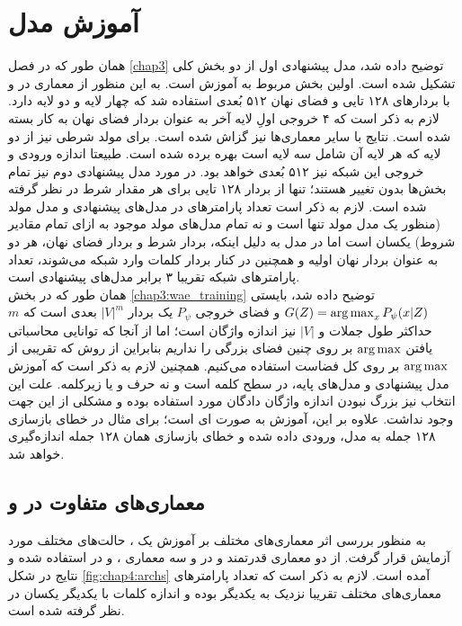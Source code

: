 \section{آموزش مدل}
همان طور که در فصل \ref{chap3} توضیح داده شد، مدل پیشنهادی اول از دو بخش کلی تشکیل شده است. اولین بخش مربوط به آموزش \wae{} است. به این منظور از معماری \transformer{} در \encoder{} و \decoder{} با بردارهای  \embedding{}
۱۲۸ تایی و فضای نهان ۵۱۲ بُعدی استفاده شد که \encoder{} چهار لایه و \decoder{} دو لایه دارد. لازم به ذکر است که ۴ خروجی اولِ لایه آخر \encoder{} به عنوان بردار فضای نهان به کار بسته شده است. نتایج با سایر معماری‌ها نیز گزاش شده‌ است. برای مولد شرطی نیز از دو لایه  که هر لایه آن شامل سه لایه  است بهره برده شده است. طبیعتا اندازه ورودی و خروجی این شبکه نیز ۵۱۲ بُعدی خواهد بود. در مورد مدل پیشنهادی دوم نیز تمام بخش‌ها بدون تغییر هستند؛ تنها از بردار \embedding{}
۱۲۸ تایی برای هر مقدار شرط در نظر گرفته شده است. لازم به ذکر است تعداد پارامتر‌های \decoder{} در مدل‌های پیشنهادی و مدل مولد \sentigan{} (منظور یک مدل مولد تنها است و نه تمام مدل‌های مولد موجود به ازای تمام مقادیر شروط) یکسان است اما در مدل \towardctg{} به دلیل اینکه، بردار شرط و بردار فضای نهان، هر دو به عنوان بردار نهان اولیه  و همچنین در کنار بردار \embedding{} کلمات وارد شبکه می‌شوند، تعداد پارامتر‌های شبکه \towardctg{} تقریبا ۳ برابر مدل‌های پیشنهادی است.
\\
همان طور که در بخش \ref{chap3:wae_training} توضیح داده شد، \decoder{} بایستی
$G(Z) = \operatorname*{arg\,max}_{x} P_\psi(x|Z)$
و فضای خروجی $P_\psi$ یک بردار $|V|^{m}$ بعدی است که $m$ حداکثر طول جملات و $|V|$ نیز اندازه واژگان است؛ اما از آنجا که توانایی محاسباتی یافتن $\operatorname*{arg\,max}$ بر روی چنین فضای بزرگی را نداریم بنابراین از روش
که تقریبی از $\operatorname*{arg\,max}$ بر روی کل فضاست استفاده می‌کنیم. همچنین لازم به ذکر است که آموزش مدل پیشنهادی و مدل‌های پایه، در سطح کلمه است و نه حرف و یا زیرکلمه. علت این انتخاب نیز بزرگ نبودن اندازه واژگان دادگان مورد استفاده بوده و مشکلی از این جهت وجود نداشت. علاوه بر این، آموزش به صورت 
ای
است؛ برای مثال در خطای بازسازی ۱۲۸ جمله به مدل، ورودی داده شده و خطای بازسازی همان ۱۲۸ جمله اندازه‌گیری خواهد شد.

\subsection{معماری‌های متفاوت در \encoder{} و \decoder{}}
به منظور بررسی اثر معماری‌های مختلف بر آموزش یک \wae{}، حالت‌های مختلف مورد آزمایش قرار گرفت. از دو معماری قدرتمند \lstm{} و \transformer{} در \decoder{} و سه معماری \lstm{}، \cnn{}  و \transformer{} در \encoder{} استفاده شده و نتایج در شکل \ref{fig:chap4:archs} آمده است. لازم به ذکر است که تعداد پارامتر‌های معماری‌های مختلف تقریبا نزدیک به یکدیگر بوده و اندازه \embedding{} کلمات با یکدیگر یکسان در نظر گرفته شده است.

